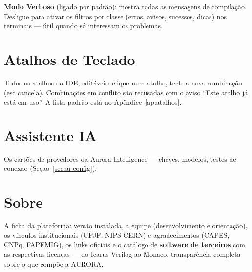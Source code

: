 \textbf{Modo Verboso} (ligado por padrão): mostra todas as mensagens de compilação. Desligue para ativar os filtros por classe (erros, avisos, sucessos, dicas) nos terminais --- útil quando só interessam os problemas.

\section{Atalhos de Teclado}

Todos os atalhos da IDE, editáveis: clique num atalho, tecle a nova combinação (esc cancela). Combinações em conflito são recusadas com o aviso \enquote{Este atalho já está em uso}. A lista padrão está no Apêndice~\ref{ap:atalhos}.

\section{Assistente IA}

Os cartões de provedores da Aurora Intelligence --- chaves, modelos, testes de conexão (Seção~\ref{sec:ai-config}).

\section{Sobre}

A ficha da plataforma: versão instalada, a equipe (desenvolvimento e orientação), os vínculos institucionais (UFJF, NIPS-CERN) e agradecimentos (CAPES, CNPq, FAPEMIG), os links oficiais e o catálogo de \textbf{software de terceiros} com as respectivas licenças --- do Icarus Verilog ao Monaco, transparência completa sobre o que compõe a AURORA.
